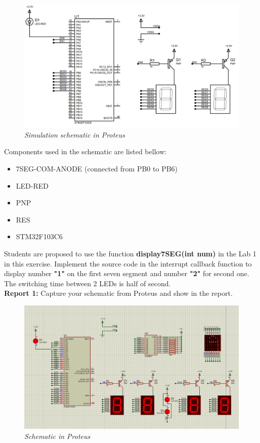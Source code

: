 \documentclass[twoside, final]{hcmut_report}
\begin{document}
\begin{figure}[!htp]
    \centering
    \includegraphics[width=5.5in]{graphics/lab2_ex1a.PNG}
    \caption{\textit{Simulation schematic in Proteus}}
    \label{bai2_pic1a}
\end{figure}
Components used in the schematic are listed bellow:
\begin{itemize}
    \item 7SEG-COM-ANODE (connected from PB0 to PB6)
    \item LED-RED
    \item PNP
    \item RES
    \item STM32F103C6
\end{itemize}


Students are proposed to use the function \textbf{display7SEG(int num)} in the Lab 1 in this exercise. Implement the source code in the interrupt callback function to display number \textbf{"1"} on the first seven segment and number \textbf{"2"} for second one. The switching time between 2 LEDs is half of second. \\

\textbf{Report 1: } Capture your schematic from Proteus and show in the report.\\
\begin{figure}[!htp]
    \centering
    \includegraphics[width=5.5in]{graphics/f1.png}
    \caption{\textit{Schematic in Proteus}}
\end{figure}
\end{document}
